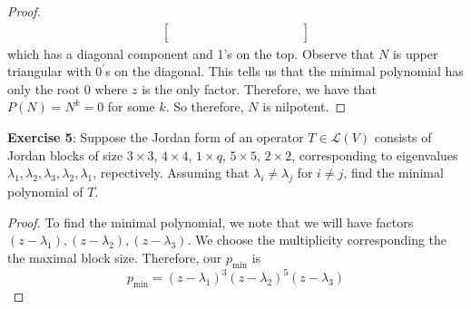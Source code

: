 \documentclass{article}
\begin{document}
\begin{proof}
\begin{align*}
\begin{bmatrix}
                                &        &             &             &        &             &        &             &             &             &  &  &  \\
                                &        &             &             &        &             &        &             &             &             &  &  &  \\
                \end{bmatrix}
            \end{align*}
        which has a diagonal component and 1's on the top. Observe that $N$ is upper triangular with $0^{\prime}$s on the diagonal. This tells us that the minimal polynomial has only the root $0$ where $z$ is the only factor. Therefore, we have that $P(N) = N^{k} = 0$ for some $k$. So therefore, $N$ is nilpotent. 
    \end{proof}
\textbf{Exercise 5}: Suppose the Jordan form of an operator $T \in \mathcal{L}(V)$ consists of Jordan blocks of size $3 \times 3$, $4 \times 4$, $1 \times q$, $5 \times 5$, $2 \times 2$, corresponding to eigenvalues $\lambda_{1}, \lambda_{2}, \lambda_{3}, \lambda_{2}, \lambda_{1}$, repectively. Assuming that $\lambda_{i} \neq \lambda_{j}$ for $i \neq j$, find the minimal polynomial of $T$.
    \begin{proof}
        To find the minimal polynomial, we note that we will have factors $(z - \lambda_{1}), (z - \lambda_{2}), (z - \lambda_{3})$. We choose the multiplicity corresponding the the maximal block size. Therefore, our $p_{\text{min}}$ is 
        \begin{equation*}
            p_{\text{min}} = (z - \lambda_{1})^{3}(z - \lambda_{2})^{5}(z - \lambda_{3})
        \end{equation*}
    \end{proof}
\end{document}
